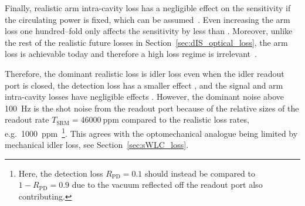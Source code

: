 Finally, realistic arm intra-cavity loss has a negligible effect on the sensitivity if the circulating power is fixed, which can be assumed~\cite{}. Even increasing the arm loss one hundred--fold only affects the sensitivity by less than . Moreover, unlike the rest of the realistic future losses in Section~\ref{sec:dIS_optical_loss}, the arm loss is achievable today  and therefore a high loss regime is irrelevant~\cite{}. %

Therefore, the dominant realistic loss is idler loss even when the idler readout port is closed, the detection loss has a smaller effect , and the signal and arm intra-cavity losses have negligible effects . However, the dominant noise above 100~Hz is the shot noise from the readout port because of the relative sizes of the readout rate $T_\text{SRM}=46000~\text{ppm}$ compared to the realistic loss rates, e.g.\ 1000~ppm~\footnote{Here, the detection loss $R_\text{PD}=0.1$ should instead be compared to $1-R_\text{PD}=0.9$ due to the vacuum reflected off the readout port also contributing.}. This agrees with the optomechanical analogue being limited by mechanical idler loss, see Section~\ref{sec:sWLC_loss}. 

